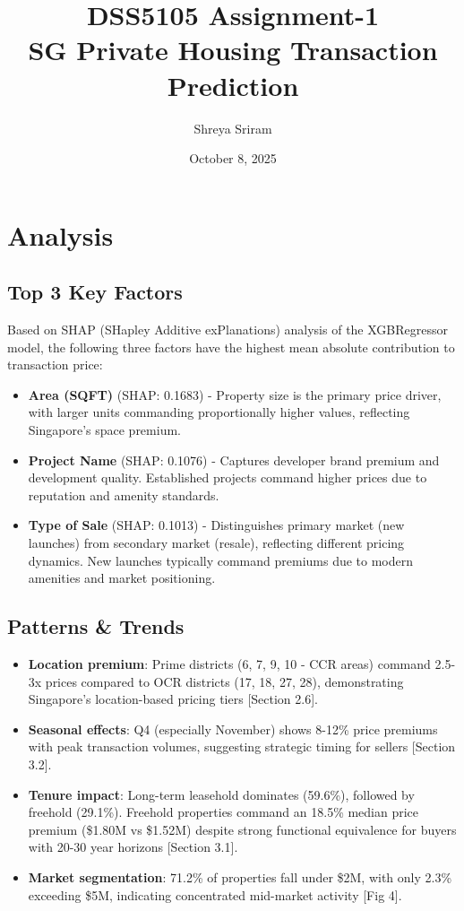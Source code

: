\documentclass{article}
\title{DSS5105 Assignment-1 \\ SG Private Housing Transaction Prediction}
\author{Shreya Sriram}
\date{October 8, 2025}
\begin{document}
\maketitle

\section{Analysis}
\subsection{Top 3 Key Factors}
Based on SHAP (SHapley Additive exPlanations) analysis of the XGBRegressor model, the following three factors have the highest mean absolute contribution to transaction price:

\begin{itemize}

\item \textbf{Area (SQFT)} (SHAP: 0.1683) - Property size is the primary price driver, with larger units commanding proportionally higher values, reflecting Singapore's space premium.

\item \textbf{Project Name} (SHAP: 0.1076) - Captures developer brand premium and development quality. Established projects command higher prices due to reputation and amenity standards.

\item \textbf{Type of Sale} (SHAP: 0.1013) - Distinguishes primary market (new launches) from secondary market (resale), reflecting different pricing dynamics. New launches typically command premiums due to modern amenities and market positioning.

\end{itemize}

\subsection{Patterns \& Trends}

\begin{itemize}
\item \textbf{Location premium}: Prime districts (6, 7, 9, 10 - CCR areas) command 2.5-3x prices compared to OCR districts (17, 18, 27, 28), demonstrating Singapore's location-based pricing tiers [Section 2.6].

\item \textbf{Seasonal effects}: Q4 (especially November) shows 8-12\% price premiums with peak transaction volumes, suggesting strategic timing for sellers [Section 3.2].

\item \textbf{Tenure impact}: Long-term leasehold dominates (59.6\%), followed by freehold (29.1\%). Freehold properties command an 18.5\% median price premium (\$1.80M vs \$1.52M) despite strong functional equivalence for buyers with 20-30 year horizons [Section 3.1].

\item \textbf{Market segmentation}: 71.2\% of properties fall under \$2M, with only 2.3\% exceeding \$5M, indicating concentrated mid-market activity [Fig 4].

\end{itemize}
\end{document}
